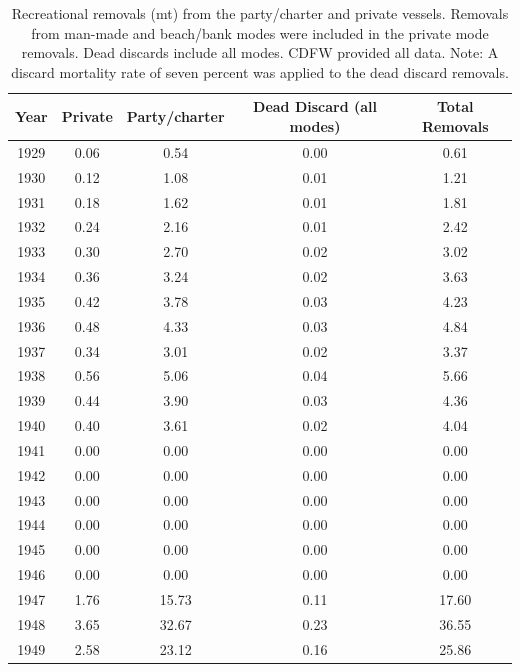 \documentclass[12pt,]{article}
\begin{document}
\FloatBarrier
\newpage

\vspace{2in}

\begin{longtable}{ccccc}
\caption{Recreational removals (mt) from the party/charter 
                                        and private vessels. Removals from man-made and 
                                        beach/bank modes were included in the private mode
                                        removals. Dead discards include all modes. CDFW provided 
                                        all data. Note: A discard mortality rate of seven percent 
                                        was applied 
                                        to the dead discard removals.} \\ 
  \hline
Year & Private & Party/charter & Dead Discard (all modes) & Total Removals \\ 
  \hline \endhead  \hline
1929 & 0.06 & 0.54 & 0.00 & 0.61 \\ 
  1930 & 0.12 & 1.08 & 0.01 & 1.21 \\ 
  1931 & 0.18 & 1.62 & 0.01 & 1.81 \\ 
  1932 & 0.24 & 2.16 & 0.01 & 2.42 \\ 
  1933 & 0.30 & 2.70 & 0.02 & 3.02 \\ 
  1934 & 0.36 & 3.24 & 0.02 & 3.63 \\ 
  1935 & 0.42 & 3.78 & 0.03 & 4.23 \\ 
  1936 & 0.48 & 4.33 & 0.03 & 4.84 \\ 
  1937 & 0.34 & 3.01 & 0.02 & 3.37 \\ 
  1938 & 0.56 & 5.06 & 0.04 & 5.66 \\ 
  1939 & 0.44 & 3.90 & 0.03 & 4.36 \\ 
  1940 & 0.40 & 3.61 & 0.02 & 4.04 \\ 
  1941 & 0.00 & 0.00 & 0.00 & 0.00 \\ 
  1942 & 0.00 & 0.00 & 0.00 & 0.00 \\ 
  1943 & 0.00 & 0.00 & 0.00 & 0.00 \\ 
  1944 & 0.00 & 0.00 & 0.00 & 0.00 \\ 
  1945 & 0.00 & 0.00 & 0.00 & 0.00 \\ 
  1946 & 0.00 & 0.00 & 0.00 & 0.00 \\ 
  1947 & 1.76 & 15.73 & 0.11 & 17.60 \\ 
  1948 & 3.65 & 32.67 & 0.23 & 36.55 \\ 
  1949 & 2.58 & 23.12 & 0.16 & 25.86 \\ 

\end{longtable}
\end{document}
